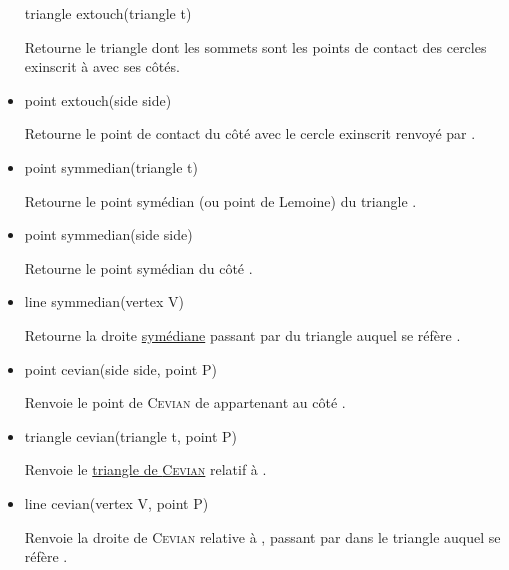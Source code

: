 \documentclass[pdftex]{article}
\begin{document}
\begin{itemize}
  \begin{Vcolor}
    triangle extouch(triangle t)
  \end{Vcolor}
  Retourne le triangle dont les sommets sont les points de contact des
  cercles exinscrit à  avec ses côtés.
\item {}
  \begin{Vcolor}
    point extouch(side side)
  \end{Vcolor}
  Retourne le point de contact du côté  avec le cercle
  exinscrit renvoyé par .
\item {}
  \begin{Vcolor}
    point symmedian(triangle t)
  \end{Vcolor}
  Retourne le point symédian (ou point de Lemoine) du triangle .
\item {}
  \begin{Vcolor}
    point symmedian(side side)
  \end{Vcolor}
  Retourne le point symédian du côté .
\item {}
  \begin{Vcolor}
    line symmedian(vertex V)
  \end{Vcolor}
  Retourne la droite
  \href{http://fr.wikipedia.org/wiki/Sym\%C3\%A9diane}{symédiane}
  passant par  du triangle auquel se réfère .
\item {}
  \begin{Vcolor}
    point cevian(side side, point P)
  \end{Vcolor}
  Renvoie le point de \textsc{Cevian} de  appartenant au côté .
\item {}
  \begin{Vcolor}
    triangle cevian(triangle t, point P)
  \end{Vcolor}
  Renvoie le
  \href{http://mathworld.wolfram.com/CevianTriangle.html}{triangle de
    \textsc{Cevian}} relatif à .
\item {}
  \begin{Vcolor}
    line cevian(vertex V, point P)
  \end{Vcolor}
  Renvoie la droite de \textsc{Cevian} relative à , passant
  par  dans le triangle auquel se réfère .


\end{itemize}
\end{document}
